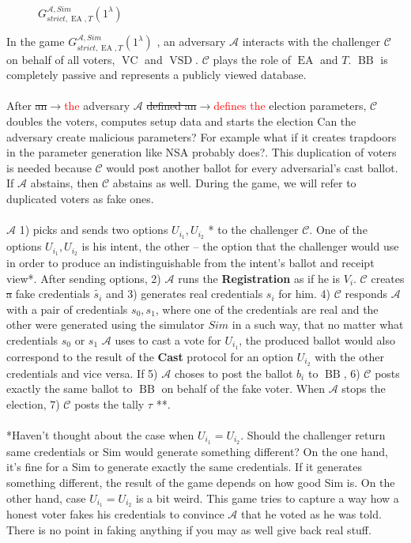 \documentclass[12pt]{article}
\newcommand{\fix}[2]{\sout{#1}$\rightarrow$\textcolor{red}{#2}}
\DeclareMathOperator{\vsd}{VSD}
\DeclareMathOperator{\ea}{EA}
\DeclareMathOperator{\bb}{BB}
\DeclareMathOperator{\voc}{VC}
\begin{document}
   \begin{figure}[h!]
 
        \caption{$G_{strict,\ea,T}^{\mathcal{A}, Sim}(1^{\lambda})$}
        \label{EAT is honest}
\end{figure}
In the game   $G_{strict,\ea,T}^{\mathcal{A}, Sim}(1^{\lambda})$ , an adversary $\mathcal{A}$ interacts with the challenger $\mathcal{C}$ on behalf of all voters, $\voc$ and $\vsd$. $\mathcal{C}$ plays the role of $\ea$ and $T$. $\bb$ is completely passive and represents a publicly viewed database. \\\\
After \fix{an}{the} adversary  $\mathcal{A}$ \fix{defined an}{defines the} election parameters, $\mathcal{C}$  doubles the voters, computes setup data and starts the election{\color{red} Can the adversary create malicious parameters? For example what if it creates trapdoors in the parameter generation like NSA probably does?}. This duplication of voters is needed because $\mathcal{C}$ would post another ballot for every adversarial's cast ballot. If $\mathcal{A}$ abstains, then $\mathcal{C}$ abstains as well. During the game, we will refer to duplicated voters as fake ones. \\\\
$\mathcal{A}$ 1) picks and sends two options $U_{i_1},U_{i_2}$ {\color{red}*} to the challenger $\mathcal{C}$. One of the options $U_{i_1}, U_{i_2}$ is his intent, the other -- the option that the challenger would use in order to produce an indistinguishable from the intent's ballot and receipt view*. After sending options, 2) $\mathcal{A}$ runs the   \textbf{Registration} as if he is $V_i$. $\mathcal{C}$ creates \sout{a} fake credentials $\tilde{s_i}$ and 3) generates real credentials $s_i$ for him. 4) $\mathcal{C}$ responds $\mathcal{A}$ with a pair of credentials $s_0,s_1$, where one of the credentials are real and the other were generated using the simulator $Sim$ in a such way, that no matter what credential{\color{red}s} $s_0$ or $s_1$ $\mathcal{A}$ uses to cast a vote for $U_{i_1}$, the produced ballot would also correspond to the result of the \textbf{Cast} protocol for an option $U_{i_2}$ with the other credentials and vice versa. If 5) $\mathcal{A}$ choses to post the ballot $b_i$ to $\bb$, 6) $\mathcal{C}$  posts exactly the same ballot to $\bb$ on behalf of the fake voter. When $\mathcal{A}$ stops the election, 7) $\mathcal{C}$ posts the tally $\tau$ **. \\\\
{\color{blue} *Haven't thought about the case when  $U_{i_1} = U_{i_2}$. Should the challenger return same credentials or Sim would generate something different? On the one hand, it's fine for a Sim to generate exactly the same credentials. If it generates something different, the result of the game depends on how good Sim is. On the other hand, case $U_{i_1} = U_{i_2}$ is a bit weird. This game tries to capture a way how a honest voter fakes his credentials to convince $\mathcal{A}$ that he voted as he was told. There is no point in faking anything if you may as well give back real stuff. } \\
\end{document}
